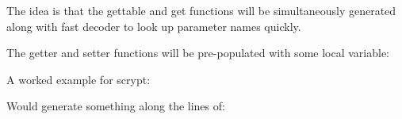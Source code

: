 The idea is that the gettable and get functions will be simultaneously generated along with fast decoder to look up parameter names quickly.

The getter and setter functions will be pre-\/populated with some local variable\+:


\begin{DoxyCode}{0}
\DoxyCodeLine{\ \ \ \ \ \ \ \ \ \ \ \ \ \ \ \textcolor{comment}{/*\ (for\ C\ types)\ */}}

\end{DoxyCode}


A worked example for scrypt\+:

Would generate something along the lines of\+:


